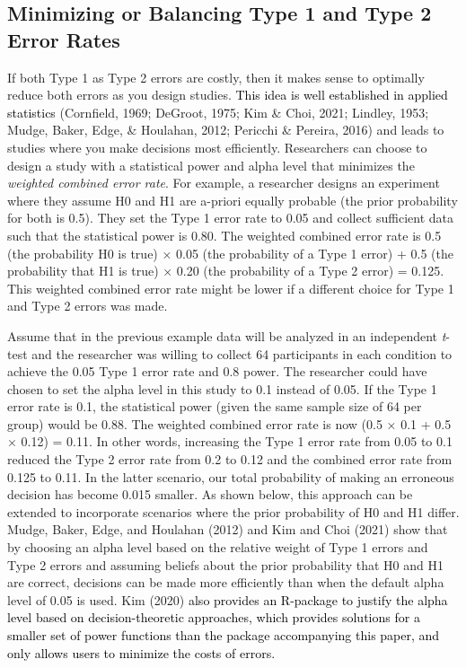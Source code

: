 \documentclass[
  english,
  ,man, a4paper,floatsintext]{apa6}
\begin{document}
\hypertarget{minimizing-or-balancing-type-1-and-type-2-error-rates}{%
\subsection{Minimizing or Balancing Type 1 and Type 2 Error Rates}\label{minimizing-or-balancing-type-1-and-type-2-error-rates}}

If both Type 1 as Type 2 errors are costly, then it makes sense to optimally reduce both errors as you design studies. \textcolor{black}{This idea is well established in applied statistics} (Cornfield, 1969; DeGroot, 1975; Kim \& Choi, 2021; Lindley, 1953; Mudge, Baker, Edge, \& Houlahan, 2012; Pericchi \& Pereira, 2016) and leads to studies where you make decisions most efficiently. Researchers can choose to design a study with a statistical power and alpha level that minimizes the \emph{weighted combined error rate}. For example, a researcher designs an experiment where they assume H0 and H1 are a-priori equally probable (the prior probability for both is 0.5). They set the Type 1 error rate to 0.05 and collect sufficient data such that the statistical power is 0.80. The weighted combined error rate is 0.5 (the probability H0 is true) × 0.05 (the probability of a Type 1 error) + 0.5 (the probability that H1 is true) × 0.20 (the probability of a Type 2 error) = 0.125. This weighted combined error rate might be lower if a different choice for Type 1 and Type 2 errors was made.

Assume that in the previous example data will be analyzed in an independent \emph{t}-test and the researcher was willing to collect 64 participants in each condition to achieve the 0.05 Type 1 error rate and 0.8 power. The researcher could have chosen to set the alpha level in this study to 0.1 instead of 0.05. If the Type 1 error rate is 0.1, the statistical power (given the same sample size of 64 per group) would be 0.88. The weighted combined error rate is now (0.5 × 0.1 + 0.5 × 0.12) = 0.11. In other words, increasing the Type 1 error rate from 0.05 to 0.1 reduced the Type 2 error rate from 0.2 to 0.12 and the combined error rate from 0.125 to 0.11. In the latter scenario, our total probability of making an erroneous decision has become 0.015 smaller. As shown below, this approach can be extended to incorporate scenarios where the prior probability of H0 and H1 differ. Mudge, Baker, Edge, and Houlahan (2012) and Kim and Choi (2021) show that by choosing an alpha level based on the relative weight of Type 1 errors and Type 2 errors and assuming beliefs about the prior probability that H0 and H1 are correct, decisions can be made more efficiently than when the default alpha level of 0.05 is used. Kim (2020) \textcolor{black}{also provides an R-package to justify the alpha level based on decision-theoretic approaches, which provides solutions for a smaller set of power functions than the package accompanying this paper, and only allows users to minimize the costs of errors.}
\end{document}
